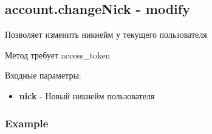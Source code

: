\subsection{account.changeNick - modify}
Позволяет изменить никнейм у текущего пользователя

Метод требует access\_token

Входные параметры:
\begin{itemize}
  \item \textbf{nick} - Новый никнейм пользователя
\end{itemize}

\subsubsection{Example}
\begin{Verbatim}[frame=single]

\end{Verbatim}

